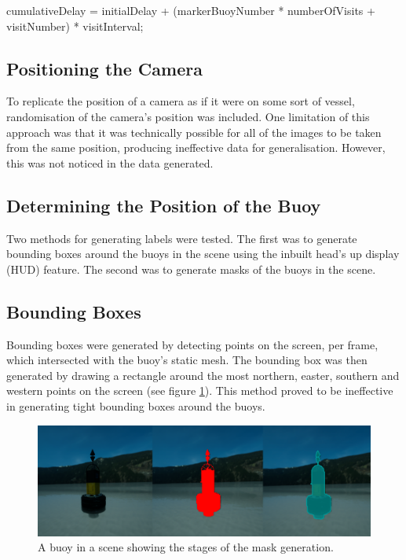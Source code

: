 \documentclass[10pt,twocolumn,letterpaper]{article}
\begin{document}
cumulativeDelay = initialDelay + (markerBuoyNumber * numberOfVisits + visitNumber) * visitInterval;
 

\subsection{Positioning the Camera} \label {sec:positioning_the_camera}

To replicate the position of a camera as if it were on some sort of vessel, randomisation of the camera's position was included. One limitation of this approach was that it was technically possible for all of the images to be taken from the same position, producing ineffective data for generalisation. However, this was not noticed in the data generated.

\subsection{Determining the Position of the Buoy}

Two methods for generating labels were tested. The first was to generate bounding boxes around the buoys in the scene using the inbuilt head's up display (HUD) feature. The second was to generate masks of the buoys in the scene. 

\subsection{Bounding Boxes}

Bounding boxes were generated by detecting points on the screen, per frame, which intersected with the buoy's static mesh. The bounding box was then generated by drawing a rectangle around the most northern, easter, southern and western points on the screen (see figure \ref{fig:buoy_with_bounding_box}). This method proved to be ineffective in generating tight bounding boxes around the buoys.

\begin{figure}[t]
    \centering
    \includegraphics[width=\linewidth]{images/masked-buoy.png}
    \caption{A buoy in a scene showing the stages of the mask generation.}
    \label{fig:buoy_with_bounding_box}
\end{figure}
\end{document}

